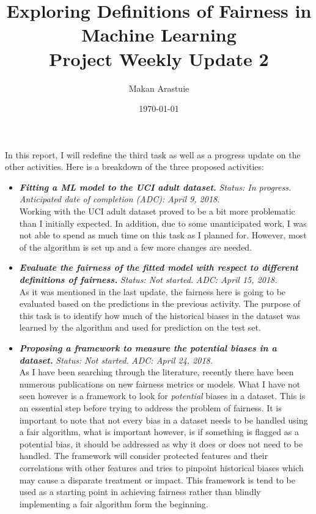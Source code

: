 \documentclass[11pt]{article}
\begin{document}
\title{%
  Exploring Definitions of Fairness in Machine Learning \\ \vspace{5mm}
  \large Project Weekly Update 2}
\author{Makan Arastuie}
\date{\today}
\maketitle


In this report, I will redefine the third task as well as a progress update on the other activities. Here is a breakdown of the three proposed activities:

\begin{itemize}

\item \textbf{\textit{Fitting a ML model to the UCI adult dataset.}} \textit{Status: In progress.} \textit{Anticipated date of completion (ADC): April 9, 2018.} \\
Working with the UCI adult dataset proved to be a bit more problematic than I initially expected. In addition, due to some unanticipated work, I was not able to spend as much time on this task as I planned for. However, most of the algorithm is set up and a few more changes are needed.

\item \textbf{\textit{Evaluate the fairness of the fitted model with respect to different definitions of fairness.}} \textit{Status: Not started.} \textit{ADC: April 15, 2018.} \\
As it was mentioned in the last update, the fairness here is going to be evaluated based on the predictions in the previous activity. The purpose of this task is to identify how much of the historical biases in the dataset was learned by the algorithm and used for prediction on the test set. 

\item \textbf{\textit{Proposing a framework to measure the potential biases in a dataset.}} \textit{Status: Not started.} \textit{ADC: April 24, 2018.} \\
As I have been searching through the literature, recently there have been numerous publications on new fairness metrics or models. What I have not seen however is a framework to look for \textit{potential} biases in a dataset. This is an essential step before trying to address the problem of fairness. It is important to note that not every bias in a dataset needs to be handled using a fair algorithm, what is important however, is if something is flagged as a potential bias, it should be addressed as why it does or does not need to be handled. The framework will consider protected features and their correlations with other features and tries to pinpoint historical biases which may cause a disparate treatment or impact. This framework is tend to be used as a starting point in achieving fairness rather than blindly implementing a fair algorithm form the beginning.

\end{itemize} 
\end{document}
